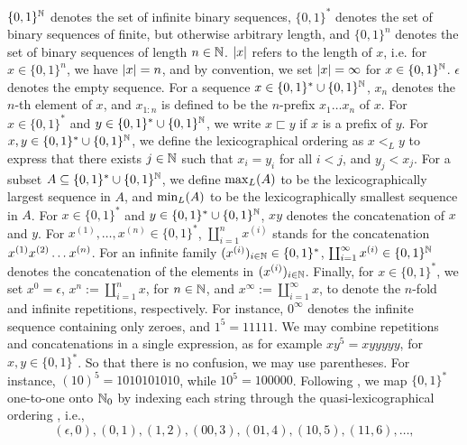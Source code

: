 $\{0,1\}^{\mathbb{N}}$ denotes the set of infinite binary sequences, $\{0,1\}^\ast$ denotes the set of binary sequences of finite, but otherwise arbitrary length, and $\{0,1\}^n$ denotes the set of binary sequences of length $n \in \mathbb{N}$. 
$\left| x \right|$ refers to the length of $x$, i.e. for $x \in \{0,1\}^n$, we have $\left| x \right| = n$, and by convention, we set $\left| x \right| = \infty$ for $x \in \{0,1\}^{\mathbb{N}}$.
$\epsilon$ denotes the empty sequence. 
For a sequence $x \in \{0,1\}^\ast \cup \{0,1\}^{\mathbb{N}}$, $x_n$ denotes the $n$-th element of $x$, and $x_{1:n}$ is defined to be the $n$-prefix $x_1 \ldots x_n$ of $x$. 
For $x \in \{0,1\}^\ast$ and $y \in \{0,1\}^\ast \cup \{0,1\}^{\mathbb{N}}$, we write $x \sqsubset y$ if $x$ is a prefix of $y$. 
For $x,y \in \{0,1\}^\ast \cup \{0, 1\}^{\mathbb{N}}$, we define the lexicographical ordering as $x <_L y$ to express that there exists $j \in \mathbb{N}$ such that $x_i = y_i$ for all $i < j$, and $y_j < x_j$.
For a subset $A \subseteq \{0,1\}^\ast \cup \{0, 1\}^{\mathbb{N}}$, we define $\mathop{\operatorname{max}_L}(A)$ to be the lexicographically largest sequence in $A$, and $\mathop{\operatorname{min}_L}(A)$ to be the lexicographically smallest sequence in $A$.
For $x \in \{0,1\}^\ast$ and $y \in \{0,1\}^\ast \cup \{0,1\}^{\mathbb{N}}$, $x y$ denotes the concatenation of $x$ and $y$. 
For $x^{(1)},\ldots, x^{(n)} \in \{0,1\}^\ast$, $\coprod_{i=1}^n x^{(i)}$ stands for the concatenation $x^{(1)} x^{(2)} \ldots \hspace{0.2mm} x^{(n)}$. 
For an infinite family $(x^{(i)})_{i\in \mathbb{N}} \in \{0,1\}^\ast$, $\coprod_{i=1}^\infty x^{(i)} \in \{0,1\}^{\mathbb{N}}$ denotes the concatenation of the elements in $(x^{(i)})_{i \in \mathbb{N}}$. Finally, for $x \in \{0,1\}^\ast$, we set $x^0 = \epsilon$, $x^n := \coprod_{i=1}^n x$, for $n \in \mathbb{N}$, and $x^\infty := \coprod_{i=1}^\infty x$, to denote the $n$-fold and infinite repetitions, respectively. 
For instance, $0^\infty$ denotes the infinite sequence containing only zeroes, and $1^5 = 11111$. 
We may combine repetitions and concatenations in a single expression, as for example $xy^5 = xyyyyy$, for $x,y \in \{0,1\}^\ast$. So that there is no confusion, we may use parentheses. For instance, $(10)^5 = 1010101010$, while $10^5 = 100000$. 
Following \cite[Ch. 1.4]{li2008introduction}, we map $\{0,1\}^\ast$ one-to-one onto $\mathbb{N}_0$ by indexing each string through the quasi-lexicographical ordering \cite[Section 1.1]{calude2002information}, i.e.,
\begin{equation}\label{eq:quasilexicographic enumeration}
	(\epsilon,0), (0,1), (1,2), (00,3), (01,4), (10,5), (11,6), \ldots,
\end{equation}
